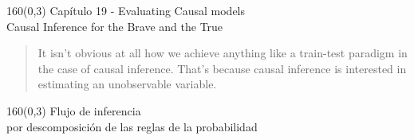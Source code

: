 \documentclass[shownotes,aspectratio=169]{beamer}
\begin{document}
%
\begin{frame}[plain]
\begin{textblock}{160}(0,3)
\centering \LARGE Capítulo 19 - Evaluating Causal models \large \\
Causal Inference for the Brave and the True
\end{textblock}

\begin{quotation}
It isn't obvious at all how we achieve anything like a train-test paradigm in the case of causal inference. That's because causal inference is interested in estimating an unobservable variable.
\end{quotation}

\end{frame}


\begin{frame}[plain]
\begin{textblock}{160}(0,3) \centering
 \LARGE Flujo de inferencia \\
 \large por descomposición de las reglas de la probabilidad
\end{textblock}





%
%


\end{frame}
\end{document}

